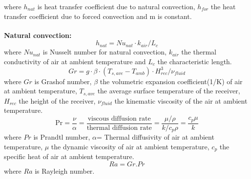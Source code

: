where $h_{nat}$ is heat transfer coefficient due to natural convection, $h_{for}$ the heat transfer coefficient due to forced convection and m is constant.\\\\
\textbf{{Natural convection:}}\\
\begin{equation}
h_{nat}=Nu_{nat}\cdot k_{air}/L_c
\end{equation}
where $Nu_{nat}$ is Nusselt number for natural convection, $k_{air}$ the thermal conductivity of air at ambient temperature and $L_c$ the characteristic length.
\begin{equation}
Gr=g \cdot \beta\cdot (T_{s,ave}-T_{amb})\cdot {H_{rec}^3/\nu_{fluid}}
\end{equation}
where $Gr$ is Grashof number, $\beta$ the volumetric expansion coefficient(1/K) of air at ambient temperature, $T_{s,ave}$ the average surface temperature of the receiver, $H_{rec}$ the height of the receiver, $\nu_{fluid}$ the kinematic viscosity of the air at ambient temperature.
\begin{equation}
\mathrm{Pr} = \frac{\nu}{\alpha} = \frac{\mbox{viscous diffusion rate}}{\mbox{thermal diffusion rate}} = \frac{\mu / \rho}{k / c_p \rho} = \frac{c_p \mu}{k}
\end{equation}
where $Pr$ is Prandtl number, $\alpha$= Thermal diffusivity of air at ambient temperature, $\mu $ the dynamic viscosity of air at ambient temperature, $c_p$ the specific heat of air at ambient temperature.
\begin{equation}
Ra=Gr.Pr
\end{equation}
where $Ra$ is Rayleigh number.\\\\

